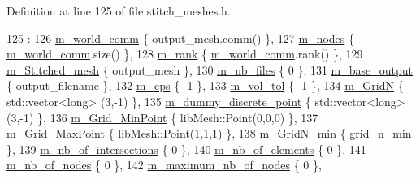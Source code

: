 Definition at line 125 of file stitch\+\_\+meshes.\+h.


\begin{DoxyCode}
125                                                                                                            
                                                                :
126         \hyperlink{classcarl_1_1_stitch___meshes_a7a19535c9488135f3fb68f18a04a9442}{m\_world\_comm} \{ output\_mesh.comm() \},
127         \hyperlink{classcarl_1_1_stitch___meshes_a9e20d5781074c285506605f0af1d024b}{m\_nodes} \{ \hyperlink{classcarl_1_1_stitch___meshes_a7a19535c9488135f3fb68f18a04a9442}{m\_world\_comm}.size() \},
128         \hyperlink{classcarl_1_1_stitch___meshes_a50b57beb1d6c0688641a52a9156b8dd2}{m\_rank} \{ \hyperlink{classcarl_1_1_stitch___meshes_a7a19535c9488135f3fb68f18a04a9442}{m\_world\_comm}.rank() \},
129         \hyperlink{classcarl_1_1_stitch___meshes_abebb40f413d1dbce1d74f9280e978ed7}{m\_Stitched\_mesh} \{ output\_mesh \},
130         \hyperlink{classcarl_1_1_stitch___meshes_a01c131c2e0c83ef1642326f6ea4f97d2}{m\_nb\_files} \{ 0 \},
131         \hyperlink{classcarl_1_1_stitch___meshes_a62dc54f7822611da525d10a57595f898}{m\_base\_output} \{ output\_filename \},
132         \hyperlink{classcarl_1_1_stitch___meshes_a1cbb52478197125ed915538dc9c717c2}{m\_eps} \{ -1 \},
133         \hyperlink{classcarl_1_1_stitch___meshes_a6c5e1728cc1118b1052f78f87c560c91}{m\_vol\_tol} \{ -1 \},
134         \hyperlink{classcarl_1_1_stitch___meshes_a4213e0cfdaf9554971d75c6b811f4bdd}{m\_GridN} \{ std::vector<long> (3,-1) \},
135         \hyperlink{classcarl_1_1_stitch___meshes_a254b2b118a6bcabe7ebeeee083f03a9a}{m\_dummy\_discrete\_point} \{ std::vector<long> (3,-1) \},
136         \hyperlink{classcarl_1_1_stitch___meshes_a7bf918ef98a9bc853afe749c44d35f35}{m\_Grid\_MinPoint} \{ libMesh::Point(0,0,0) \},
137         \hyperlink{classcarl_1_1_stitch___meshes_a06ac179f70188b5fed34f32e88a37787}{m\_Grid\_MaxPoint} \{ libMesh::Point(1,1,1) \},
138         \hyperlink{classcarl_1_1_stitch___meshes_a573f149c7418656a45be9613d3183b5e}{m\_GridN\_min} \{ grid\_n\_min \},
139         \hyperlink{classcarl_1_1_stitch___meshes_a764e63989a934f87105b5f978ec999f1}{m\_nb\_of\_intersections} \{ 0 \},
140         \hyperlink{classcarl_1_1_stitch___meshes_a4ed4ce7e9a185c3fd2bd92755888a37e}{m\_nb\_of\_elements} \{ 0 \},
141         \hyperlink{classcarl_1_1_stitch___meshes_adfdcce2888197b90c9e56449d1a75b6b}{m\_nb\_of\_nodes} \{ 0 \},
142         \hyperlink{classcarl_1_1_stitch___meshes_a5583a82a08d9560d4b7bf2c1c3c9b815}{m\_maximum\_nb\_of\_nodes} \{ 0 \},

\end{DoxyCode}
